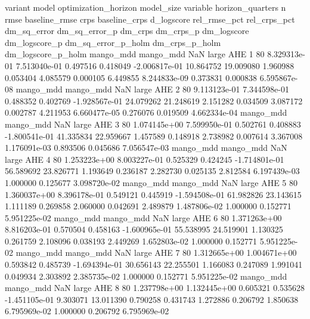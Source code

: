   variant     model  optimization_horizon model_size variable  horizon_quarters  n         rmse  baseline_rmse          crps  baseline_crps    d_logscore  rel_rmse_pct  rel_crps_pct  dm_sq_error  dm_sq_error_p   dm_crps  dm_crps_p  dm_logscore  dm_logscore_p  dm_sq_error_p_holm  dm_crps_p_holm  dm_logscore_p_holm
mango_mdd mango_mdd                   NaN      large      AHE                 1 80 8.329313e-01   7.513040e-01      0.497516       0.418049 -2.006817e-01     10.864752     19.009080     1.960988       0.053404  4.085579   0.000105     6.449855   8.244833e-09            0.373831        0.000838        6.595867e-08
mango_mdd mango_mdd                   NaN      large      AHE                 2 80 9.113123e-01   7.344598e-01      0.488352       0.402769 -1.928567e-01     24.079262     21.248619     2.151282       0.034509  3.087172   0.002787     4.211953   6.660477e-05            0.276076        0.019509        4.662334e-04
mango_mdd mango_mdd                   NaN      large      AHE                 3 80 1.074145e+00   7.599950e-01      0.502761       0.408883 -1.800541e-01     41.335834     22.959667     1.457589       0.148918  2.738982   0.007614     3.367008   1.176091e-03            0.893506        0.045686        7.056547e-03
mango_mdd mango_mdd                   NaN      large      AHE                 4 80 1.253223e+00   8.003227e-01      0.525329       0.424245 -1.714801e-01     56.589692     23.826771     1.193649       0.236187  2.282730   0.025135     2.812584   6.197439e-03            1.000000        0.125677        3.098720e-02
mango_mdd mango_mdd                   NaN      large      AHE                 5 80 1.360037e+00   8.396178e-01      0.549121       0.445919 -1.594508e-01     61.982826     23.143615     1.111189       0.269858  2.060000   0.042691     2.489879   1.487806e-02            1.000000        0.152771        5.951225e-02
mango_mdd mango_mdd                   NaN      large      AHE                 6 80 1.371263e+00   8.816203e-01      0.570504       0.458163 -1.600965e-01     55.538995     24.519901     1.130325       0.261759  2.108096   0.038193     2.449269   1.652803e-02            1.000000        0.152771        5.951225e-02
mango_mdd mango_mdd                   NaN      large      AHE                 7 80 1.312665e+00   1.004671e+00      0.593842       0.485739 -1.694394e-01     30.656143     22.255501     1.166083       0.247089  1.991041   0.049934     2.303892   2.385735e-02            1.000000        0.152771        5.951225e-02
mango_mdd mango_mdd                   NaN      large      AHE                 8 80 1.237798e+00   1.132445e+00      0.605321       0.535628 -1.451105e-01      9.303071     13.011390     0.790258       0.431743  1.272886   0.206792     1.850638   6.795969e-02            1.000000        0.206792        6.795969e-02
